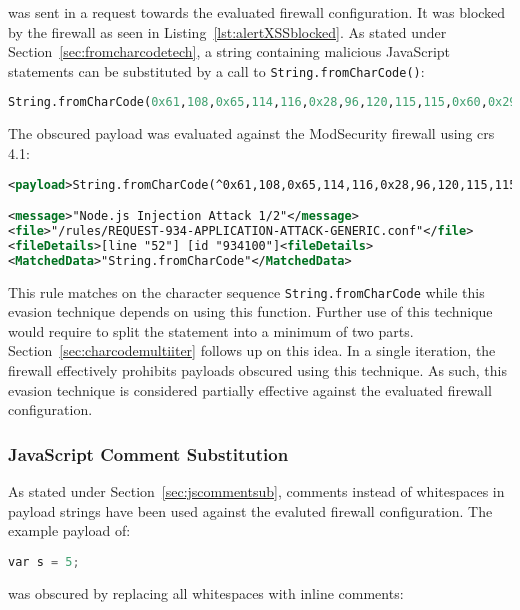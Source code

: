 was sent in a request towards the evaluated firewall configuration. It was blocked by the firewall as seen in Listing~\ref{lst:alertXSSblocked}. 
As stated under Section~\ref{sec:fromcharcodetech}, a string containing malicious JavaScript statements can be substituted by a call to \verb|String.fromCharCode()|:

\begin{lstlisting}[style=basicStyle, language=Python, escapeinside=\^\^]
String.fromCharCode(0x61,108,0x65,114,116,0x28,96,120,115,115,0x60,0x29)
\end{lstlisting}

The obscured payload was evaluated against the ModSecurity firewall using \acrshort{crs} 4.1:

\begin{lstlisting}[style=ruleStyle, language=XML, caption=fromCharCode() blocked, label={lst:fromcharcodeblocked}]
<payload>String.fromCharCode(^0x61,108,0x65,114,116,0x28,96,120,115,115,0x60,0x29^)</payload>

<message>"Node.js Injection Attack 1/2"</message>
<file>"/rules/REQUEST-934-APPLICATION-ATTACK-GENERIC.conf"</file>
<fileDetails>[line "52"] [id "934100"]<fileDetails>
<MatchedData>"String.fromCharCode"</MatchedData>
\end{lstlisting}

This rule matches on the character sequence \verb|String.fromCharCode| while this evasion technique depends on using this function. Further use of this technique would require to split the statement into a minimum of two parts. Section~\ref{sec:charcodemultiiter} follows up on this idea. In a single iteration, the firewall effectively prohibits payloads obscured using this technique. As such, this evasion technique is considered partially effective against the evaluated firewall configuration.

\subsubsection{JavaScript Comment Substitution}
\label{sec:jscommentsubsingleiter}
As stated under Section~\ref{sec:jscommentsub}, comments instead of whitespaces in payload strings have been used against the evaluted firewall configuration. The example payload of:

\begin{lstlisting}[style=basicStyle,language=Python]
var s = 5;
\end{lstlisting}

was obscured by replacing all whitespaces with inline comments:

